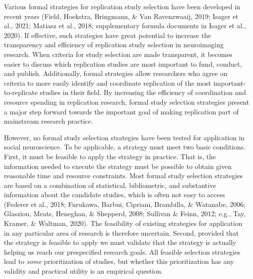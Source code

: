 \documentclass[
  man,floatsintext]{apa6}
\begin{document}
Various formal strategies for replication study selection have been developed in recent years (Field, Hoekstra, Bringmann, \& Van Ravenzwaaij, 2019; Isager et al., 2021; Matiasz et al., 2018; supplementary formula documents in Isager et al., 2020). If effective, such strategies have great potential to increase the transparency and efficiency of replication study selection in neuroimaging research. When criteria for study selection are made transparent, it becomes easier to discuss which replication studies are most important to fund, conduct, and publish. Additionally, formal strategies allow researchers who agree on criteria to more easily identify and coordinate replication of the most important-to-replicate studies in their field. By increasing the efficiency of coordination and resource spending in replication research, formal study selection strategies present a major step forward towards the important goal of making replication part of mainstream research practice.

However, no formal study selection strategies have been tested for application in social neuroscience. To be applicable, a strategy must meet two basic conditions. First, it must be feasible to apply the strategy in practice. That is, the information needed to execute the strategy must be possible to obtain given reasonable time and resource constraints. Most formal study selection strategies are based on a combination of statistical, bibliometric, and substantive information about the candidate studies, which is often not easy to access (Federer et al., 2018; Furukawa, Barbui, Cipriani, Brambilla, \& Watanabe, 2006; Glasziou, Meats, Heneghan, \& Shepperd, 2008; Sullivan \& Feinn, 2012; e.g., Tay, Kramer, \& Waltman, 2020). The feasibility of existing strategies for application in any particular area of research is therefore uncertain. Second, provided that the strategy is feasible to apply we must validate that the strategy is actually helping us reach our prespecified research goals. All feasible selection strategies lead to \emph{some} prioritization of studies, but whether this prioritization has any validity and practical utility is an empirical question.
\end{document}
